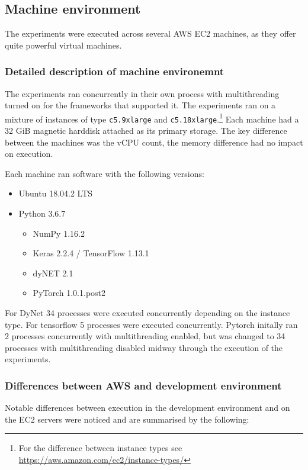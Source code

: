 \subsection{Machine environment}

The experiments were executed across several AWS EC2 machines, as they offer
quite powerful virtual machines.

\subsubsection{Detailed description of machine environemnt}

The experiments ran concurrently in their own process with multithreading
turned on for the frameworks that supported it. The experiments ran on a
mixture of instances of type \texttt{c5.9xlarge} and
\texttt{c5.18xlarge}.\footnote{For the difference between instance types see
\url{https://aws.amazon.com/ec2/instance-types/}}
Each machine had a 32 GiB magnetic harddisk attached as its primary storage.
The key difference between the machines was the vCPU count, the memory
difference had no impact on execution.

Each machine ran software with the following versions:
\begin{itemize}
  \item{Ubuntu 18.04.2 LTS}
  \item{Python 3.6.7}
  \begin{itemize}
    \item{NumPy 1.16.2}
    \item{Keras 2.2.4 / TensorFlow 1.13.1}
    \item{dyNET 2.1}
    \item{PyTorch 1.0.1.post2}
  \end{itemize}
\end{itemize}

For DyNet 34 processes were executed concurrently depending on the
instance type.
For tensorflow 5 processes were executed concurrently.
Pytorch initally ran 2 processes concurrently with multithreading enabled, but
was changed to 34 processes with multithreading disabled midway through the
execution of the experiments.

\subsubsection{Differences between AWS and development environment}

Notable differences between execution in the development environment and on the
EC2 servers were noticed and are summarised by the following:

